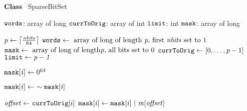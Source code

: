     \STATE $\textbf{Class~}$ SparseBitSet
    \item[]
      \STATE $\texttt{words}$: array of long  \label{line:sbsfield:start}
      \STATE $\texttt{currToOrig}$: array of int 
      \STATE $\texttt{limit}$: int 
      \STATE $\texttt{mask}$: array of long  \label{line:sbsfield:end}

    \item[]
     \label{line:initsbs:start}
      \STATE $\mathit{p} \gets \left\lceil\frac{\mathit{nbits}}{64}\right\rceil$
      \STATE $\texttt{words} \gets \text{~array of long of length~} \mathit{p} \text{, first~} 
      \mathit{nbits} \text{~set to 1}$
      \STATE $\texttt{mask} \gets \text{~array of long of length} \mathit{p} \text{, all bits set to~}0$
      \STATE $\texttt{currToOrig} \gets [0, \ldots, \mathit{p} - 1]$
      \STATE $\texttt{limit} \gets \mathit{p-1}$ \label{line:initsbs:end}
      \Endfunc

    \item[]
       \label{line:isEmpty:1}
       \label{line:isEmpty:2}
      \Endfunc
    \item[]
       \label{line:clearMask:1}
       \label{line:clearMask:2}
        \STATE $\texttt{mask}[\mathit{i}] \gets 0^{64}$ \label{line:clearMask:4}
      \EndFor
      \Endfunc

    \item[]
       \label{line:reverse:1}
       \label{line:reverse:2}
      \STATE $\texttt{mask}[\localvar{i}] \gets \ \sim\texttt{mask}[\localvar{i}]$  \label{line:reverse:4}
      \EndFor
      \Endfunc

    \item[]
       \label{line:addToMask:1}
       \label{line:addToMask:2}
      \STATE $\mathit{offset} \gets \texttt{currToOrig}[i]$ \label{line:addToMask:3}
      \STATE $\texttt{mask}[\localvar{i}] \gets \texttt{mask}[\localvar{i}] \ | \ 
      \localvar{m}[\localvar{offset}]$  \label{line:addToMask:4}
      \EndFor
      \Endfunc


